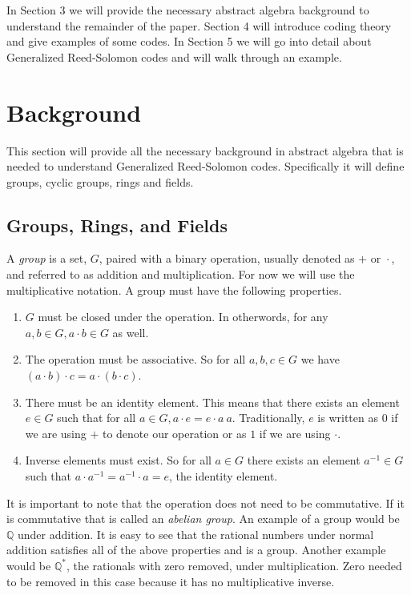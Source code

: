 \documentclass{article}
\begin{document}
In Section 3 we will provide the necessary abstract algebra background to understand the remainder of the paper. Section 4 will introduce coding theory and give examples of some codes. In Section 5 we will go into detail about Generalized Reed-Solomon codes and will walk through an example.

\section{Background}
This section will provide all the necessary background in abstract algebra that is needed to understand Generalized Reed-Solomon codes. Specifically it will define groups, cyclic groups, rings and fields. %

\subsection{Groups, Rings, and Fields}
A \textit{group} is a set, $G$, paired with a binary operation, usually denoted as $+ \text{ or } \cdot$, and referred to as addition and multiplication. For now we will use the multiplicative notation. A group must have the following properties.
\begin{enumerate}
  \item $G$ must be closed under the operation. In otherwords, for any $a, b \in G, a \cdot b \in G$ as well.
  \item The operation must be associative. So for all $a,b,c \in G$ we have $(a \cdot b) \cdot c = a \cdot (b \cdot c)$.
  \item There must be an identity element. This means that there exists an element $e \in G$ such that for all $a \in G, a \cdot e = e \cdot a \ a$. Traditionally, $e$ is written as $0$ if we are using $+$ to denote our operation or as $1$ if we are using $\cdot$.
  \item Inverse elements must exist. So for all $a \in G$ there exists an element $a^{-1} \in G$ such that $a \cdot a^{-1} = a^{-1} \cdot a = e$, the identity element.
\end{enumerate}
It is important to note that the operation does not need to be commutative. If it is commutative that is called an \textit{abelian group}. An example of a group would be $\mathbb{Q}$ under addition. It is easy to see that the rational numbers under normal addition satisfies all of the above properties and is a group. Another example would be $\mathbb{Q}^{*}$, the rationals with zero removed, under multiplication. Zero needed to be removed in this case because it has no multiplicative inverse.
\end{document}
